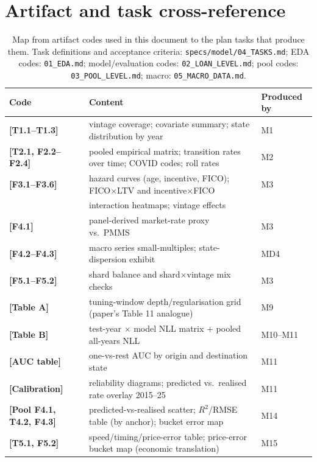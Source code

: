\documentclass[11pt,a4paper]{article}
\newcommand{\code}[1]{\texttt{#1}}
\newcommand{\artifact}[1]{\textbf{[#1]}}
\begin{document}
\appendix
\section{Artifact and task cross-reference}\label{app:artifacts}

\begin{table}[h]
\centering\small
\begin{tabular}{lll}
\toprule
Code & Content & Produced by \\
\midrule
\artifact{T1.1--T1.3} & vintage coverage; covariate summary; state distribution by year & M1 \\
\artifact{T2.1, F2.2--F2.4} & pooled empirical matrix; transition rates over time; COVID codes; roll rates & M2 \\
\artifact{F3.1--F3.6} & hazard curves (age, incentive, FICO); FICO$\times$LTV and incentive$\times$FICO & M3 \\
 & interaction heatmaps; vintage effects & \\
\artifact{F4.1} & panel-derived market-rate proxy vs.\ PMMS & M3 \\
\artifact{F4.2--F4.3} & macro series small-multiples; state-dispersion exhibit & MD4 \\
\artifact{F5.1--F5.2} & shard balance and shard$\times$vintage mix checks & M3 \\
\artifact{Table A} & tuning-window depth/regularisation grid (paper's Table 11 analogue) & M9 \\
\artifact{Table B} & test-year $\times$ model NLL matrix + pooled all-years NLL & M10--M11 \\
\artifact{AUC table} & one-vs-rest AUC by origin and destination state & M11 \\
\artifact{Calibration} & reliability diagrams; predicted vs.\ realised rate overlay 2015--25 & M11 \\
\artifact{Pool F4.1, T4.2, F4.3} & predicted-vs-realised scatter; $R^2$/RMSE table (by anchor); bucket error map & M14 \\
\artifact{T5.1, F5.2} & speed/timing/price-error table; price-error bucket map (economic translation) & M15 \\
\bottomrule
\end{tabular}
\caption{Map from artifact codes used in this document to the plan tasks that produce them. Task definitions and acceptance criteria: \code{specs/model/04\_TASKS.md}; EDA codes: \code{01\_EDA.md}; model/evaluation codes: \code{02\_LOAN\_LEVEL.md}; pool codes: \code{03\_POOL\_LEVEL.md}; macro: \code{05\_MACRO\_DATA.md}.}
\label{tab:artifactmap}
\end{table}
\end{document}
